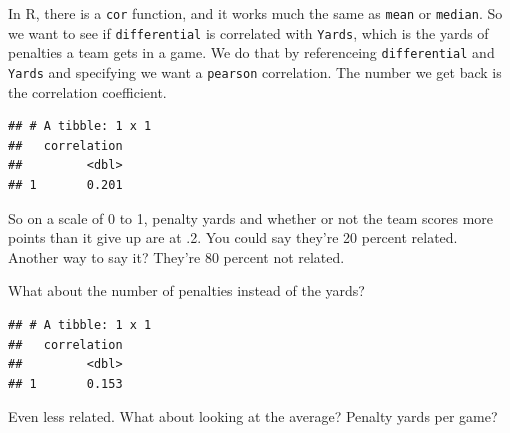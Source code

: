 \documentclass[]{book}
\newenvironment{Shaded}{\begin{snugshade}}{\end{snugshade}}
\newcommand{\DataTypeTok}[1]{\textcolor[rgb]{0.13,0.29,0.53}{#1}}
\newcommand{\KeywordTok}[1]{\textcolor[rgb]{0.13,0.29,0.53}{\textbf{#1}}}
\newcommand{\NormalTok}[1]{#1}
\newcommand{\OperatorTok}[1]{\textcolor[rgb]{0.81,0.36,0.00}{\textbf{#1}}}
\newcommand{\StringTok}[1]{\textcolor[rgb]{0.31,0.60,0.02}{#1}}
\begin{document}
In R, there is a \texttt{cor} function, and it works much the same as \texttt{mean} or \texttt{median}. So we want to see if \texttt{differential} is correlated with \texttt{Yards}, which is the yards of penalties a team gets in a game. We do that by referenceing \texttt{differential} and \texttt{Yards} and specifying we want a \texttt{pearson} correlation. The number we get back is the correlation coefficient.

\begin{Shaded}
\end{Shaded}

\begin{verbatim}
## # A tibble: 1 x 1
##   correlation
##         <dbl>
## 1       0.201
\end{verbatim}

So on a scale of 0 to 1, penalty yards and whether or not the team scores more points than it give up are at .2. You could say they're 20 percent related. Another way to say it? They're 80 percent not related.

What about the number of penalties instead of the yards?

\begin{Shaded}
\end{Shaded}

\begin{verbatim}
## # A tibble: 1 x 1
##   correlation
##         <dbl>
## 1       0.153
\end{verbatim}

Even less related. What about looking at the average? Penalty yards per game?

\begin{Shaded}
\end{Shaded}
\end{document}
